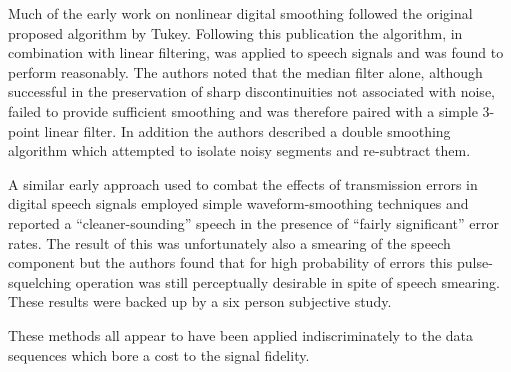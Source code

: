 Much of the early work on nonlinear digital smoothing followed the original proposed algorithm by Tukey\cite{Tukey1974}. Following this publication the algorithm, in combination with linear filtering, was applied to speech signals and was found to perform reasonably\cite{Rabiner1975}. The authors noted that the median filter alone, although successful in the preservation of sharp discontinuities not associated with noise, failed to provide sufficient smoothing and was therefore paired with a simple 3-point linear filter. In addition the authors described a double smoothing algorithm which attempted to isolate noisy segments and re-subtract them.


%
%
A similar early approach used to combat the effects of transmission errors in digital speech signals employed simple waveform-smoothing techniques and reported a ``cleaner-sounding'' speech in the presence of ``fairly significant'' error rates\cite{Jayant1976}. The result of this was unfortunately also a smearing of the speech component but the authors found that for high probability of errors this pulse-squelching operation was still perceptually desirable in spite of speech smearing. These results were backed up by a six person subjective study.

%
%

These methods all appear to have been applied indiscriminately to the data sequences which bore a cost to the signal fidelity.


